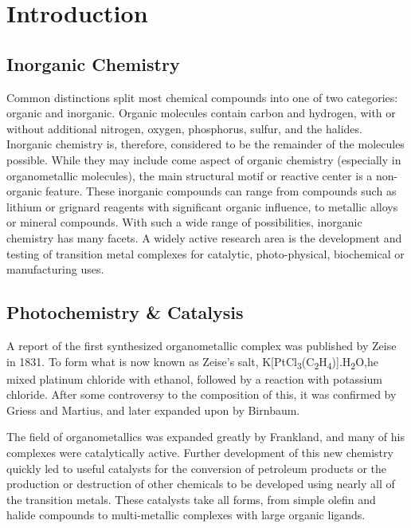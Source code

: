 \chapter{Introduction}
\section{Inorganic Chemistry}

Common distinctions split most chemical compounds into one of two categories: organic and inorganic. Organic molecules contain carbon and hydrogen, with or without additional nitrogen, oxygen, phosphorus, sulfur, and the halides. Inorganic chemistry is, therefore, considered to be the remainder of the molecules possible. While they may include come aspect of organic chemistry (especially in organometallic molecules), the main structural motif or reactive center is a non-organic feature. These inorganic compounds can range from compounds such as lithium or grignard reagents with significant organic influence, to metallic alloys or mineral compounds. With such a wide range of possibilities, inorganic chemistry has many facets. A widely active research area is the development and testing of transition metal complexes for catalytic, photo-physical, biochemical or manufacturing uses.

\section{Photochemistry \& Catalysis}

A report of the first synthesized organometallic complex was published by Zeise in 1831\autocite{zeise1831}. To form what is now known as Zeise's salt, K[PtCl\textsubscript{3}(C\textsubscript{2}H\textsubscript{4})].H\textsubscript{2}O,he mixed platinum chloride with ethanol, followed by a reaction with potassium chloride\autocite{hunt1984}. After some controversy to the composition of this, it was confirmed by Griess and Martius\autocite{griess1861}, and later expanded upon by Birnbaum\autocite{birnbaum1868}. 

The field of organometallics was expanded greatly by Frankland, and many of his complexes were catalytically active. Further development of this new chemistry quickly led to useful catalysts for the conversion of petroleum products or the production or destruction of other chemicals to be developed using nearly all of the transition metals. These catalysts take all forms, from simple olefin and halide compounds to multi-metallic complexes with large organic ligands.

